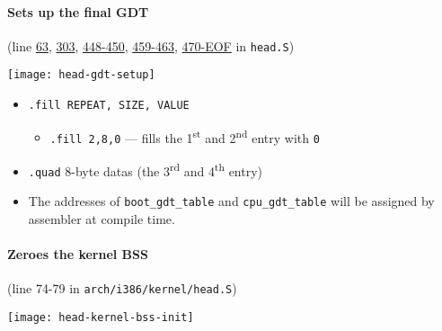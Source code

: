 \paragraph{Sets up the final GDT}

(line \href{http://lxr.linux.no/linux+v2.6.11/arch/i386/kernel/head.S\#L63}{63},
\href{http://lxr.linux.no/linux+v2.6.11/arch/i386/kernel/head.S\#L303}{303},
\href{http://lxr.linux.no/linux+v2.6.11/arch/i386/kernel/head.S\#L448}{448-450},
\href{http://lxr.linux.no/linux+v2.6.11/arch/i386/kernel/head.S\#L459}{459-463},
\href{http://lxr.linux.no/linux+v2.6.11/arch/i386/kernel/head.S\#L470}{470-EOF} in \texttt{head.S})

\begin{center}
  \texttt{[image: head-gdt-setup]}
\end{center}
  
\begin{itemize}
\item \texttt{.fill REPEAT, SIZE, VALUE}
  \begin{itemize}
  \item \texttt{.fill 2,8,0} --- fills the 1\textsuperscript{st} and
    2\textsuperscript{nd} entry with \texttt{0}
  \end{itemize}
\item \texttt{.quad} 8-byte datas (the 3\textsuperscript{rd} and 4\textsuperscript{th}
  entry)
\item The addresses of \texttt{boot\_gdt\_table} and \texttt{cpu\_gdt\_table} will be assigned
  by assembler at compile time.
\end{itemize}

\paragraph{Zeroes the kernel BSS}
(line 74-79 in \texttt{arch/i386/kernel/head.S})

\begin{center}
  \texttt{[image: head-kernel-bss-init]}
\end{center}
  

